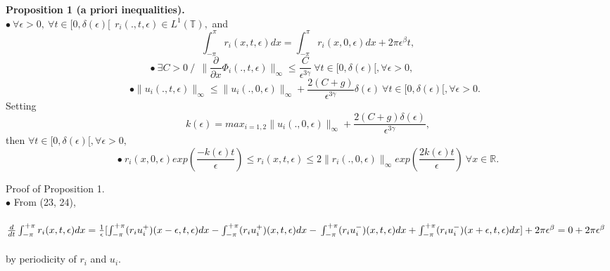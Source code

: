 \documentclass[a4paper,12pt]{article}
\begin{document}
 \textbf {Proposition 1 (a priori inequalities).}\\
    $ \bullet \  \forall \epsilon>0, \ \forall   t\in [0,\delta(\epsilon)[ \  \ r_i(.,t,\epsilon)\in L^1(\mathbb{T}),$  and   \begin{equation}\int_{-\pi}^\pi  r_i(x,t,\epsilon)dx = \int_{-\pi}^\pi r_i(x,0,\epsilon)dx+2\pi\epsilon^\beta t,\end{equation} 
     \begin{equation}  \bullet  \ \exists C>0 \ / \ \ \|\frac{\partial}{\partial x}\Phi_i(.,t,\epsilon)\|_\infty \leq \frac{C}{\epsilon^{3\gamma}} \ \forall       t\in [0,\delta(\epsilon)[,\forall \epsilon>0, \ \ \ \ \ \ \ \ \ \ \ \ \ \ \ \ \ \ \ \ \ \  \ \  \end{equation}
      \begin{equation} \bullet \|u_i(.,t,\epsilon)\|_\infty \leq  \|u_i(.,0,\epsilon)\|_\infty +\frac{2(C+g)} {\epsilon^{3\gamma}}\delta(\epsilon) \  \forall       t\in [0,\delta(\epsilon)[,\forall \epsilon>0. \ \ \  \end{equation}
      Setting 
  \begin{equation} k(\epsilon)=max_{i=1,2}\|u_i(.,0,\epsilon)\|_\infty+  \frac{2(C+g) \delta(\epsilon)}{\epsilon^{3\gamma}},\end{equation}
   then  $\forall       t\in [0,\delta(\epsilon)[,\forall \epsilon>0, $ 
      \begin{equation} \bullet       \ r_i(x,0,\epsilon)exp(\frac{-k(\epsilon)t}{\epsilon}) \leq r_i(x,t,\epsilon) \leq 2\|r_i(.,0,\epsilon)\|_\infty exp(\frac{2k(\epsilon)t}{\epsilon})  \ \forall x\in \mathbb{R}.\end{equation} 

Proof of  Proposition 1.\\

 $\bullet$ From (23, 24),\\
\\
      $\frac{d}{dt}\int_{-\pi}^{+\pi}r_i(x,t,\epsilon)dx=
      \frac{1}{\epsilon}[\int_{-\pi}^{+\pi}(r_i u_i^+)(x-\epsilon,t,\epsilon)dx-\int_{-\pi}^{+\pi}(r_i u_i^+)(x,t,\epsilon)dx-\\
\\
\int_{-\pi}^{+\pi}(r_i u_i^-)(x,t,\epsilon)dx+\int_{-\pi}^{+\pi}(r_i u_i^-)(x+\epsilon,t,\epsilon)dx]+2\pi\epsilon^\beta 
   =0+2\pi\epsilon^\beta$\\ 
\\
     by periodicity of $r_i$ and $u_i$.  \\ 
   
\end{document}
